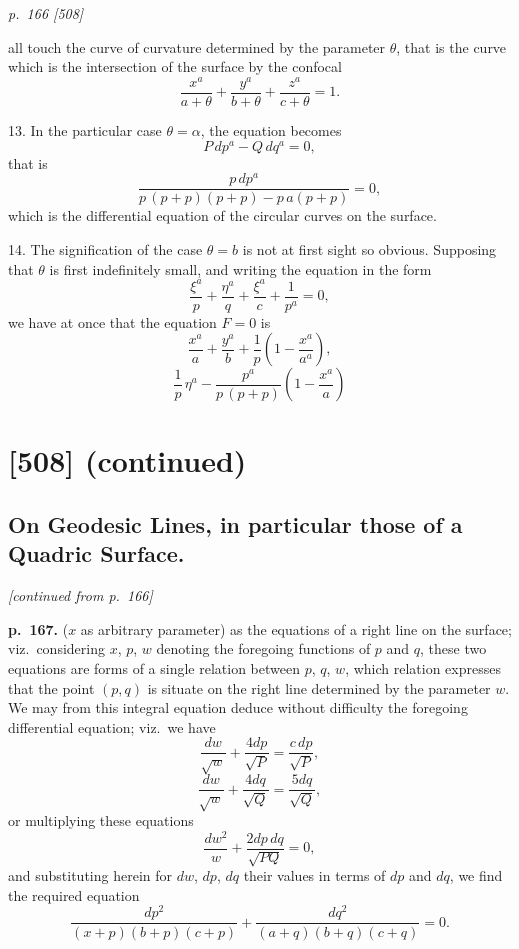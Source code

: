 \documentclass[11pt,a4paper]{book}
\begin{document}
\clearpage

\bigskip
\textit{p.~166 [508]}
\smallskip

\noindent
all touch the curve of curvature determined by the parameter $\theta$, that is the curve
which is the intersection of the surface by the confocal
\[
\frac{x^a}{a + \theta} + \frac{y^a}{b + \theta} + \frac{z^a}{c + \theta} = 1.
\]

13. In the particular case $\theta = \alpha$, the equation becomes
\[
P\,dp^a - Q\,dq^a = 0,
\]
that is
\[
\frac{p\,dp^a}{p\,(p + p)(p + p) - p\,a(p + p)} = 0,
\]
which is the differential equation of the circular curves on the surface.

14. The signification of the case $\theta = b$ is not at first sight so obvious. Supposing
that $\theta$ is first indefinitely small, and writing the equation in the form
\[
\frac{\xi^a}{p} + \frac{\eta^a}{q} + \frac{\xi^a}{c} + \frac{1}{p^a} = 0,
\]
we have at once that the equation $F = 0$ is
\[
\frac{x^a}{a} + \frac{y^a}{b} + \frac{1}{p}\left(1 - \frac{x^a}{a^a}\right),
\]
\[
\frac{1}{p}\,\eta^a - \frac{p^a}{p\,(p + p)}\left(1 - \frac{x^a}{a}\right)
\]

\clearpage
\clearpage


\section*{[508] (continued)}
\subsection*{On Geodesic Lines, in particular those of a Quadric Surface.}

\begin{center}
\textit{[continued from p.~166]}
\end{center}

\noindent
\textbf{p.~167.} ($x$ as arbitrary parameter) as the equations of a right line on the surface;
viz.\ considering $x$, $p$, $w$ denoting the foregoing functions of $p$ and $q$, these two equations
are forms of a single relation between $p$, $q$, $w$, which relation expresses that the point
$(p, q)$ is situate on the right line determined by the parameter $w$.  We may from
this integral equation deduce without difficulty the foregoing differential equation;
viz.\ we have
\[
\frac{dw}{\sqrt{w}} + \frac{4 dp}{\sqrt{P}} = \frac{c \, dp}{\sqrt{P}},
\]
\[
\frac{dw}{\sqrt{w}} + \frac{4 dq}{\sqrt{Q}} = \frac{5 dq}{\sqrt{Q}},
\]
or multiplying these equations
\[
\frac{dw^2}{w} + \frac{2 dp \, dq}{\sqrt{PQ}} = 0,
\]
and substituting herein for $dw$, $dp$, $dq$ their values in terms of $dp$ and $dq$, we find the required equation
\[
\frac{dp^2}{(x+p)(b+p)(c+p)} + \frac{dq^2}{(a+q)(b+q)(c+q)} = 0.
\]
\end{document}
